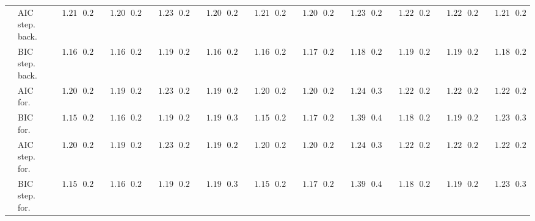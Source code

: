 \begin{tabular}{llllllllllllllllllllll}
	& AIC step. back.  & $\phantom{00}1.218$ & $\phantom{0}0.249$ & $\phantom{00}1.207$ & $\phantom{0}0.239$ & $\phantom{00}1.231$ & $\phantom{0}0.262$ & $\phantom{00}1.207$ & $\phantom{0}0.254$ & $\phantom{00}1.216$ & $\phantom{0}0.235$ & $\phantom{00}1.209$ & $\phantom{0}0.237$ & $\phantom{00}1.238$ & $\phantom{0}0.256$ & $\phantom{00}1.221$ & $\phantom{0}0.256$ & $\phantom{00}1.223$ & $\phantom{0}0.249$ & $\phantom{00}1.216$ & $\phantom{0}0.243$ \\
	& BIC step. back.  & $\phantom{00}1.164$ & $\phantom{0}0.243$ & $\phantom{00}1.168$ & $\phantom{0}0.261$ & $\phantom{00}1.196$ & $\phantom{0}0.259$ & $\phantom{00}1.169$ & $\phantom{0}0.249$ & $\phantom{00}1.163$ & $\phantom{0}0.245$ & $\phantom{00}1.174$ & $\phantom{0}0.232$ & $\phantom{00}1.188$ & $\phantom{0}0.248$ & $\phantom{00}1.191$ & $\phantom{0}0.267$ & $\phantom{00}1.199$ & $\phantom{0}0.248$ & $\phantom{00}1.180$ & $\phantom{0}0.248$ \\
	& AIC for.  & $\phantom{00}1.209$ & $\phantom{0}0.247$ & $\phantom{00}1.197$ & $\phantom{0}0.243$ & $\phantom{00}1.231$ & $\phantom{0}0.263$ & $\phantom{00}1.195$ & $\phantom{0}0.245$ & $\phantom{00}1.201$ & $\phantom{0}0.233$ & $\phantom{00}1.204$ & $\phantom{0}0.243$ & $\phantom{00}1.248$ & $\phantom{0}0.321$ & $\phantom{00}1.223$ & $\phantom{0}0.260$ & $\phantom{00}1.221$ & $\phantom{0}0.248$ & $\phantom{00}1.225$ & $\phantom{0}0.292$ \\
	& BIC for.  & $\phantom{00}1.159$ & $\phantom{0}0.252$ & $\phantom{00}1.163$ & $\phantom{0}0.261$ & $\phantom{00}1.195$ & $\phantom{0}0.255$ & $\phantom{00}1.196$ & $\phantom{0}0.308$ & $\phantom{00}1.156$ & $\phantom{0}0.241$ & $\phantom{00}1.171$ & $\phantom{0}0.236$ & $\phantom{00}1.396$ & $\phantom{0}0.402$ & $\phantom{00}1.188$ & $\phantom{0}0.263$ & $\phantom{00}1.199$ & $\phantom{0}0.244$ & $\phantom{00}1.230$ & $\phantom{0}0.368$ \\
	& AIC step. for.  & $\phantom{00}1.209$ & $\phantom{0}0.247$ & $\phantom{00}1.197$ & $\phantom{0}0.243$ & $\phantom{00}1.231$ & $\phantom{0}0.263$ & $\phantom{00}1.196$ & $\phantom{0}0.246$ & $\phantom{00}1.201$ & $\phantom{0}0.233$ & $\phantom{00}1.202$ & $\phantom{0}0.243$ & $\phantom{00}1.244$ & $\phantom{0}0.321$ & $\phantom{00}1.223$ & $\phantom{0}0.260$ & $\phantom{00}1.221$ & $\phantom{0}0.248$ & $\phantom{00}1.225$ & $\phantom{0}0.292$ \\
	& BIC step. for.  & $\phantom{00}1.159$ & $\phantom{0}0.252$ & $\phantom{00}1.163$ & $\phantom{0}0.261$ & $\phantom{00}1.195$ & $\phantom{0}0.255$ & $\phantom{00}1.196$ & $\phantom{0}0.308$ & $\phantom{00}1.156$ & $\phantom{0}0.241$ & $\phantom{00}1.171$ & $\phantom{0}0.236$ & $\phantom{00}1.396$ & $\phantom{0}0.402$ & $\phantom{00}1.188$ & $\phantom{0}0.263$ & $\phantom{00}1.199$ & $\phantom{0}0.244$ & $\phantom{00}1.230$ & $\phantom{0}0.368$ \\

\end{tabular}
